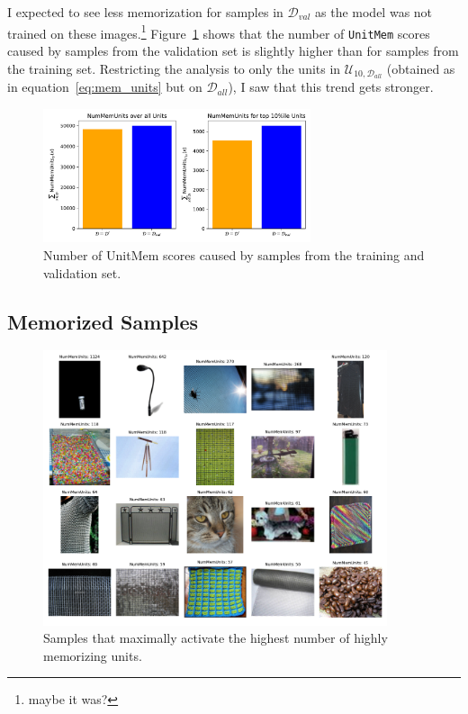 \documentclass{article} %
\begin{document}
I expected to see less memorization for samples in $\mathcal{D}_{val}$ as the model was not trained on these images.\footnote{maybe it was?}
Figure~\ref{fig:val_respon_num} shows that the number of \texttt{UnitMem} scores caused by samples from the validation set is slightly higher than for samples from the training set.
Restricting the analysis to only the units in $\mathcal{U}_{10,\mathcal{D}_{all}}$ (obtained as in equation~\ref{eq:mem_units} but on $\mathcal{D}_{all}$), I saw that this trend gets stronger.

\begin{figure}[ht]
   \centering
   \includegraphics[width=0.7\textwidth]{figures/num_mem_units_train_val.pdf}
   \caption{Number of UnitMem scores caused by samples from the training and validation set.}
   \label{fig:val_respon_num}
\end{figure}
\newpage
\subsection{Memorized Samples}
\begin{figure}[ht]
   \centering
   \includegraphics[width=0.9\textwidth]{figures/mem_samples.pdf}
   \caption{Samples that maximally activate the highest number of highly memorizing units.}
   \label{fig:mem_samples}
\end{figure}
\end{document}
